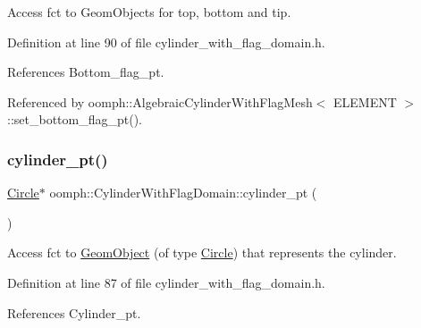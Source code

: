 Access fct to Geom\+Objects for top, bottom and tip. 



Definition at line 90 of file cylinder\+\_\+with\+\_\+flag\+\_\+domain.\+h.



References Bottom\+\_\+flag\+\_\+pt.



Referenced by oomph\+::\+Algebraic\+Cylinder\+With\+Flag\+Mesh$<$ E\+L\+E\+M\+E\+N\+T $>$\+::set\+\_\+bottom\+\_\+flag\+\_\+pt().

\mbox{\label{classoomph_1_1CylinderWithFlagDomain_a783f430b790953da4e01720be56d1872}} 
\subsubsection{\texorpdfstring{cylinder\+\_\+pt()}{cylinder\_pt()}}
{\footnotesize\ttfamily \hyperlink{classoomph_1_1Circle}{Circle}$\ast$ oomph\+::\+Cylinder\+With\+Flag\+Domain\+::cylinder\+\_\+pt (\begin{DoxyParamCaption}{ }\end{DoxyParamCaption})\hspace{0.3cm}{\ttfamily [inline]}}



Access fct to \hyperlink{classoomph_1_1GeomObject}{Geom\+Object} (of type \hyperlink{classoomph_1_1Circle}{Circle}) that represents the cylinder. 



Definition at line 87 of file cylinder\+\_\+with\+\_\+flag\+\_\+domain.\+h.



References Cylinder\+\_\+pt.

\mbox{\label{classoomph_1_1CylinderWithFlagDomain_aa0f0db0fdf2b271a6dde42ef36e9d40d}} 
